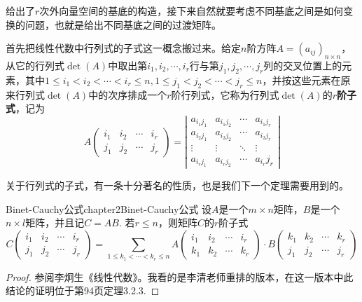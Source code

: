 给出了$r$次外向量空间的基底的构造，接下来自然就要考虑不同基底之间是如何变换的问题，也就是给出不同基底之间的过渡矩阵。

首先把线性代数中行列式的子式这一概念搬过来。给定$n$阶方阵$A=(a_{ij})_{n\times n}$，从它的行列式$\operatorname{det}(A)$中取出第$i_{1},i_{2},\cdots,i_{r}$行与第$j_{1},j_{2},\cdots,j_{r}$列的交叉位置上的元素，其中$1\leqslant i_{1}<i_{2}<\cdots <i_{r}\leqslant n,1\leqslant j_{1}<j_{2}<\cdots <j_{r}\leqslant n$，并按这些元素在原来行列式$\operatorname{det}(A)$中的次序排成一个$r$阶行列式，它称为行列式$\operatorname{det}(A)$的\textbf{$r$阶子式}，记为
\[
A\left(\begin{array}{cccc}i_{1} & i_{2} & \cdots & i_{r} \\j_{1} & j_{2} & \cdots & j_{r}\end{array}\right)=\left|\begin{array}{cccc}
	a_{i_{1} j_{1}} & a_{i_{1} j_{2}} & \cdots & a_{i_{1} j_{r}} \\
	a_{i_{2} j_{1}} & a_{i_{2} j_{2}} & \cdots & a_{i_{2} j_{r}} \\
	\vdots & \vdots & \ddots & \vdots \\
	a_{i_{r} j_{1}} & a_{i_{r} j_{2}} & \cdots & a_{i_{r}} j_{r}
	\end{array}\right|
\]

关于行列式的子式，有一条十分著名的性质，也是我们下一个定理需要用到的。
\begin{mylem}{Binet-Cauchy公式}{chapter2Binet-Cauchy公式}
设$A$是一个$m\times n$矩阵，$B$是一个$n\times l$矩阵，并且记$C=AB$. 若$r\leqslant n$，则矩阵$C$的$r$阶子式
\[
C\left(\begin{array}{cccc}i_{1} & i_{2} & \cdots & i_{r} \\j_{1} & j_{2} & \cdots & j_{r}\end{array}\right)=\sum\limits_{1\leqslant k_{1}<\cdots<k_{r}\leqslant n}A\left(\begin{array}{cccc}i_{1} & i_{2} & \cdots & i_{r} \\k_{1} & k_{2} & \cdots & k_{r}\end{array}\right)\cdot B\left(\begin{array}{cccc}k_{1} & k_{2} & \cdots & k_{r} \\j_{1} & j_{2} & \cdots & j_{r}\end{array}\right)
\]
\end{mylem}
\begin{proof}
参阅李炯生《线性代数》。我看的是李清老师重排的版本，在这一版本中此结论的证明位于第94页定理3.2.3.
\end{proof}

